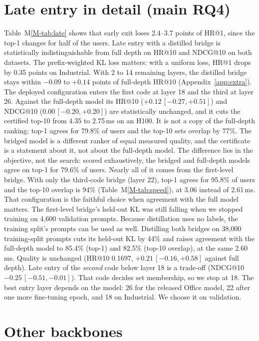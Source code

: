 \documentclass[sigconf,anonymous]{acmart}
\begin{document}
\section{Late entry in detail (main RQ4)}
Table~M\ref{M-tab:late} shows that early exit loses 2.4--3.7 points of HR@1, since the top-1 changes for half of
the users. Late entry with a distilled bridge is statistically indistinguishable from full depth on HR@10 and
NDCG@10 on both datasets. The prefix-weighted KL loss matters: with a uniform loss, HR@1 drops by 0.35 points on
Industrial. With 2 to 14 remaining layers, the distilled bridge stays within $-0.09$ to $+0.14$ points of
full-depth HR@10 (Appendix~\ref{app:extra}). The deployed configuration enters the first code at layer 18 and the third at layer
26. Against the full-depth model its HR@10 ($+0.12\,[-0.27,+0.51]$) and NDCG@10 ($0.00\,[-0.20,+0.20]$) are
statistically unchanged, and it cuts the certified top-10 from 4.35 to 2.75\,ms on an H100. It is not a copy of
the full-depth ranking: top-1 agrees for 79.8\% of users and the top-10 sets overlap by 77\%. The bridged model is
a different ranker of equal measured quality, and the certificate is a statement about it, not about the
full-depth model. The difference lies in the objective, not the search: scored exhaustively, the bridged and
full-depth models agree on top-1 for 79.6\% of users. Nearly all of it comes from the first-level bridge. With
only the third-code bridge (layer 22), top-1 agrees for 95.8\% of users and the top-10 overlap is 94\%
(Table~M\ref{M-tab:speed}), at 3.06 instead of 2.61\,ms. That configuration is the faithful choice when agreement
with the full model matters. The first-level bridge's held-out KL was still falling when we stopped training on
4,600 validation prompts. Because distillation uses no labels, the training split's prompts can be used as well.
Distilling both bridges on 38,000 training-split prompts cuts its held-out KL by 44\% and raises agreement with
the full-depth model to 85.4\% (top-1) and 82.5\% (top-10 overlap), at the same 2.60\,ms. Quality is unchanged
(HR@10 0.1697, $+0.21\,[-0.16,+0.58]$ against full depth). Late entry of the \emph{second} code below layer
18 is a trade-off (NDCG@10 $-0.25\,[-0.51,-0.01]$). That code decides set membership, so we stop at 18. The best
entry layer depends on the model: 26 for the released Office model, 22 after one more fine-tuning epoch, and 18
on Industrial. We choose it on validation.


\section{Other backbones}
\label{sec:exp-backbones}
\end{document}
